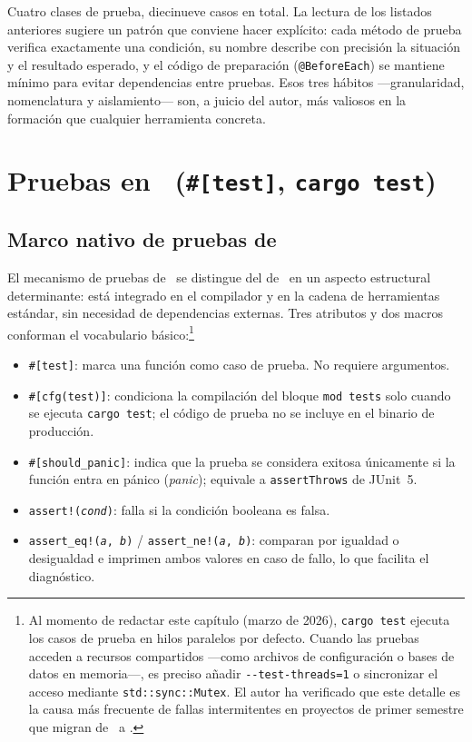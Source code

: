 Cuatro clases de prueba, diecinueve casos en total. La lectura de los listados anteriores
sugiere un patrón que conviene hacer explícito: cada método de prueba verifica exactamente
una condición, su nombre describe con precisión la situación y el resultado esperado, y
el código de preparación (\texttt{@BeforeEach}) se mantiene mínimo para evitar dependencias
entre pruebas. Esos tres hábitos ---granularidad, nomenclatura y aislamiento--- son,
a juicio del autor, más valiosos en la formación que cualquier herramienta concreta.


\section{Pruebas en \rust\ (\texttt{\#[test]}, \texttt{cargo test})}
\label{sec:pruebas-rust}

\subsection{Marco nativo de pruebas de \rust}
\label{subsec:rust-test-marco}

El mecanismo de pruebas de \rust\ se distingue del de \java\ en un aspecto estructural
determinante: está integrado en el compilador y en la cadena de herramientas estándar,
sin necesidad de dependencias externas. Tres atributos y dos macros conforman el vocabulario
básico:\footnote{Al momento de redactar este capítulo (marzo de 2026), \texttt{cargo test}
ejecuta los casos de prueba en hilos paralelos por defecto. Cuando las pruebas acceden a
recursos compartidos ---como archivos de configuración o bases de datos en memoria---,
es preciso añadir \texttt{-{}-test-threads=1} o sincronizar el acceso mediante
\texttt{std::sync::Mutex}. El autor ha verificado que este detalle es la causa más frecuente
de fallas intermitentes en proyectos de primer semestre que migran de \java\ a \rust.}

\begin{itemize}
  \item \texttt{\#[test]}: marca una función como caso de prueba. No requiere argumentos.
  \item \texttt{\#[cfg(test)]}: condiciona la compilación del bloque \texttt{mod tests}
        solo cuando se ejecuta \texttt{cargo test}; el código de prueba no se incluye
        en el binario de producción.
  \item \texttt{\#[should\_panic]}: indica que la prueba se considera exitosa únicamente
        si la función entra en pánico (\textit{panic}); equivale a \texttt{assertThrows}
        de JUnit~5.
  \item \texttt{assert!(\textit{cond})}: falla si la condición booleana es falsa.
  \item \texttt{assert\_eq!(\textit{a}, \textit{b})} / \texttt{assert\_ne!(\textit{a}, \textit{b})}:
        comparan por igualdad o desigualdad e imprimen ambos valores en caso de fallo,
        lo que facilita el diagnóstico.
\end{itemize}

